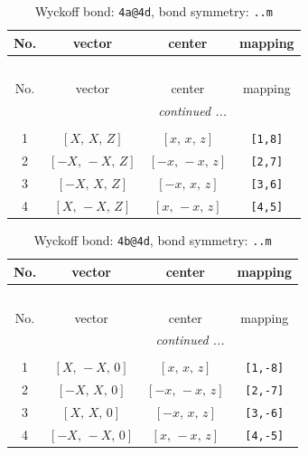 \documentclass[fleqn,8pt]{jsarticle}
\begin{document}
\begin{longtable}{cccc}
\caption{Wyckoff bond: {\tt 4a@4d}, bond symmetry: {\tt ..m}}
 \\
 \hline \hline
No. & vector & center & mapping \\ \hline \endfirsthead

\multicolumn{3}{l}{\tablename\ \thetable{}} \\
 \hline \hline
No. & vector & center & mapping \\ \hline \endhead

 \hline \hline
\multicolumn{3}{r}{\footnotesize\it continued ...} \\ \endfoot

 \hline \hline
\multicolumn{3}{r}{} \\ \endlastfoot

1 & $\left[ X,\, X,\, Z \right]$ & $\left[ x,\, x,\, z \right]$ & {\tt [1,8]} \\ \hline
2 & $\left[ - X,\, - X,\, Z \right]$ & $\left[ - x,\, - x,\, z \right]$ & {\tt [2,7]} \\ \hline
3 & $\left[ - X,\, X,\, Z \right]$ & $\left[ - x,\, x,\, z \right]$ & {\tt [3,6]} \\ \hline
4 & $\left[ X,\, - X,\, Z \right]$ & $\left[ x,\, - x,\, z \right]$ & {\tt [4,5]} \\
\end{longtable}
\renewcommand{\arraystretch}{1.2}
\begin{longtable}{cccc}
\caption{Wyckoff bond: {\tt 4b@4d}, bond symmetry: {\tt ..m}}
 \\
 \hline \hline
No. & vector & center & mapping \\ \hline \endfirsthead

\multicolumn{3}{l}{\tablename\ \thetable{}} \\
 \hline \hline
No. & vector & center & mapping \\ \hline \endhead

 \hline \hline
\multicolumn{3}{r}{\footnotesize\it continued ...} \\ \endfoot

 \hline \hline
\multicolumn{3}{r}{} \\ \endlastfoot

1 & $\left[ X,\, - X,\, 0 \right]$ & $\left[ x,\, x,\, z \right]$ & {\tt [1,-8]} \\ \hline
2 & $\left[ - X,\, X,\, 0 \right]$ & $\left[ - x,\, - x,\, z \right]$ & {\tt [2,-7]} \\ \hline
3 & $\left[ X,\, X,\, 0 \right]$ & $\left[ - x,\, x,\, z \right]$ & {\tt [3,-6]} \\ \hline
4 & $\left[ - X,\, - X,\, 0 \right]$ & $\left[ x,\, - x,\, z \right]$ & {\tt [4,-5]} \\
\end{longtable}
\end{document}
